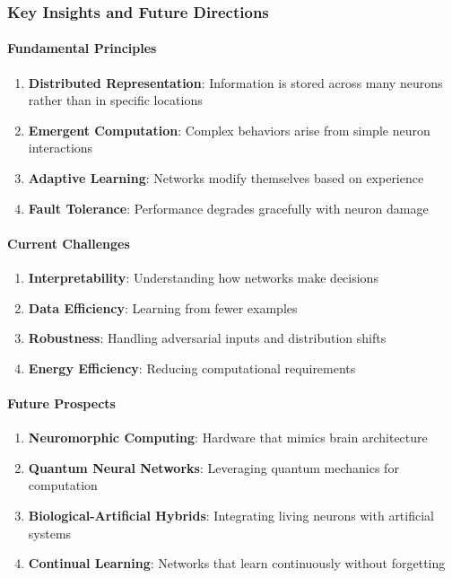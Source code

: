 \subsubsection{Key Insights and Future Directions}
\label{subsubsec:key-insights-future}

\paragraph{Fundamental Principles}
\label{para:fundamental-principles-nn}

\begin{enumerate}
\item \textbf{Distributed Representation}: Information is stored across many neurons rather than in specific locations
\item \textbf{Emergent Computation}: Complex behaviors arise from simple neuron interactions
\item \textbf{Adaptive Learning}: Networks modify themselves based on experience
\item \textbf{Fault Tolerance}: Performance degrades gracefully with neuron damage
\end{enumerate}

\paragraph{Current Challenges}
\label{para:current-challenges-nn}

\begin{enumerate}
\item \textbf{Interpretability}: Understanding how networks make decisions
\item \textbf{Data Efficiency}: Learning from fewer examples
\item \textbf{Robustness}: Handling adversarial inputs and distribution shifts
\item \textbf{Energy Efficiency}: Reducing computational requirements
\end{enumerate}

\paragraph{Future Prospects}
\label{para:future-prospects-nn}

\begin{enumerate}
\item \textbf{Neuromorphic Computing}: Hardware that mimics brain architecture
\item \textbf{Quantum Neural Networks}: Leveraging quantum mechanics for computation
\item \textbf{Biological-Artificial Hybrids}: Integrating living neurons with artificial systems
\item \textbf{Continual Learning}: Networks that learn continuously without forgetting
\end{enumerate}

